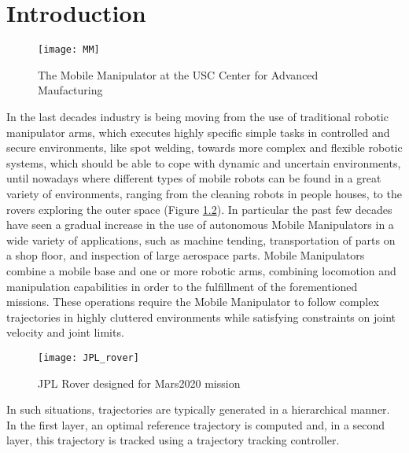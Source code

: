 \chapter{Introduction}
\label{chapter1}
\begin{figure}
	\centering
	\texttt{[image: MM]}
	\caption{The Mobile Manipulator at the USC Center for Advanced Maufacturing}
	\label{fig:MM}
\end{figure}
In the last decades industry is being moving from the use of traditional robotic manipulator arms, which executes highly specific simple tasks in controlled and secure environments, like spot welding, towards more complex and flexible robotic systems, which should be able to cope with dynamic and uncertain environments, until nowadays where different types of mobile robots can be found in a great variety of environments, ranging from the cleaning robots in people houses, to the rovers exploring the outer space (Figure \ref{JPL_rover}). In particular the past few decades have seen a gradual increase in the use of autonomous Mobile Manipulators in a wide variety of applications, such as machine tending, transportation of parts on a shop floor, and inspection of large aerospace parts. Mobile Manipulators combine a mobile base and one or more robotic arms, combining locomotion and manipulation capabilities in order to the fulfillment of the forementioned missions. These operations require the Mobile Manipulator to follow complex trajectories in highly cluttered environments while satisfying constraints on joint velocity and joint limits.
\begin{figure}[t]
	\centering
	\texttt{[image: JPL\_rover]}
	\caption{JPL Rover designed for Mars2020 mission}
	\label{JPL_rover}
\end{figure}
In such situations, trajectories are typically generated in a hierarchical manner. In the first layer, an optimal reference trajectory is computed and, in a second layer, this trajectory is tracked using a trajectory tracking controller.\\
